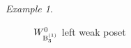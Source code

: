 \documentclass[a4paper]{amsart}
\theoremstyle{remark}
\newtheorem{example}[thm]{Example}
\numberwithin{equation}{section}
\begin{document}
\begin{example}
\begin{figure}[ht]
{\begin{tikzpicture}


\end{tikzpicture}
}
\caption{$W_{\mathrm{B}_{3}^{(1)}}^0$ left weak poset}
\label{F:B3poset}
\end{figure}

\end{example}
\end{document}
